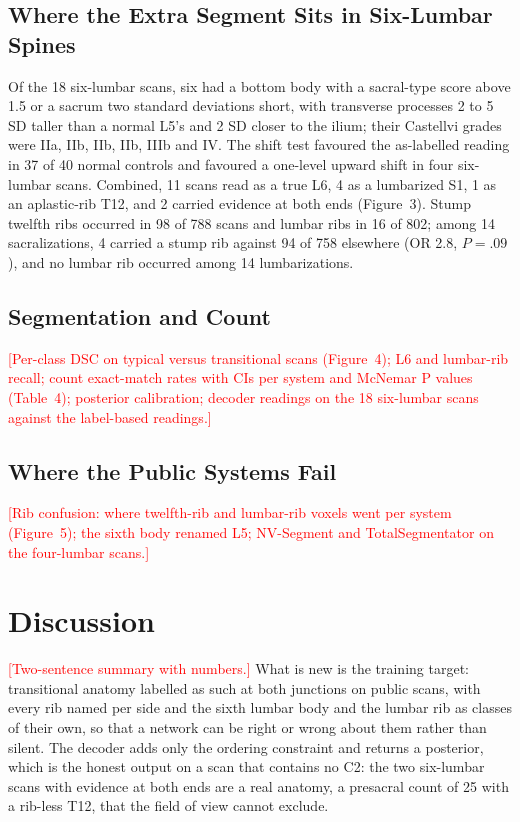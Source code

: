 \documentclass[12pt]{article}
\newcommand{\todo}[1]{\textcolor{red}{[#1]}}
\begin{document}
\subsection*{Where the Extra Segment Sits in Six-Lumbar Spines}
Of the 18 six-lumbar scans, six had a bottom body with a sacral-type score above 1.5 or a sacrum two standard deviations short, with transverse processes 2 to 5 SD taller than a normal L5's and 2 SD closer to the ilium; their Castellvi grades were IIa, IIb, IIb, IIb, IIIb and IV. The shift test favoured the as-labelled reading in 37 of 40 normal controls and favoured a one-level upward shift in four six-lumbar scans. Combined, 11 scans read as a true L6, 4 as a lumbarized S1, 1 as an aplastic-rib T12, and 2 carried evidence at both ends (Figure~3). Stump twelfth ribs occurred in 98 of 788 scans and lumbar ribs in 16 of 802; among 14 sacralizations, 4 carried a stump rib against 94 of 758 elsewhere (OR 2.8, $P = .09$), and no lumbar rib occurred among 14 lumbarizations.

\subsection*{Segmentation and Count}
\todo{Per-class DSC on typical versus transitional scans (Figure~4); L6 and lumbar-rib recall; count exact-match rates with CIs per system and McNemar P values (Table~4); posterior calibration; decoder readings on the 18 six-lumbar scans against the label-based readings.}

\subsection*{Where the Public Systems Fail}
\todo{Rib confusion: where twelfth-rib and lumbar-rib voxels went per system (Figure~5); the sixth body renamed L5; NV-Segment and TotalSegmentator on the four-lumbar scans.}

\section{Discussion}
\todo{Two-sentence summary with numbers.} What is new is the training target: transitional anatomy labelled as such at both junctions on public scans, with every rib named per side and the sixth lumbar body and the lumbar rib as classes of their own, so that a network can be right or wrong about them rather than silent. The decoder adds only the ordering constraint and returns a posterior, which is the honest output on a scan that contains no C2: the two six-lumbar scans with evidence at both ends are a real anatomy, a presacral count of 25 with a rib-less T12, that the field of view cannot exclude.
\end{document}
